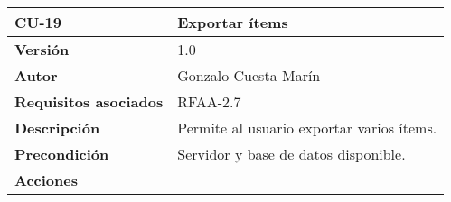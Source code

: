 \begin{longtable}[]{@{}ll@{}}
\toprule
\begin{minipage}[b]{0.23\columnwidth}\raggedright
\textbf{CU-19}\strut
\end{minipage} & \begin{minipage}[b]{0.71\columnwidth}\raggedright
\textbf{Exportar ítems}\strut
\end{minipage}\tabularnewline
\midrule
\endhead
\begin{minipage}[t]{0.23\columnwidth}\raggedright
\textbf{Versión}\strut
\end{minipage} & \begin{minipage}[t]{0.71\columnwidth}\raggedright
1.0\strut
\end{minipage}\tabularnewline
\begin{minipage}[t]{0.23\columnwidth}\raggedright
\textbf{Autor}\strut
\end{minipage} & \begin{minipage}[t]{0.71\columnwidth}\raggedright
Gonzalo Cuesta Marín\strut
\end{minipage}\tabularnewline
\begin{minipage}[t]{0.23\columnwidth}\raggedright
\textbf{Requisitos asociados}\strut
\end{minipage} & \begin{minipage}[t]{0.71\columnwidth}\raggedright
RFAA-2.7\strut
\end{minipage}\tabularnewline
\begin{minipage}[t]{0.23\columnwidth}\raggedright
\textbf{Descripción}\strut
\end{minipage} & \begin{minipage}[t]{0.71\columnwidth}\raggedright
Permite al usuario exportar varios ítems.\strut
\end{minipage}\tabularnewline
\begin{minipage}[t]{0.23\columnwidth}\raggedright
\textbf{Precondición}\strut
\end{minipage} & \begin{minipage}[t]{0.71\columnwidth}\raggedright
Servidor y base de datos disponible.\strut
\end{minipage}\tabularnewline
\begin{minipage}[t]{0.23\columnwidth}\raggedright
\textbf{Acciones}\strut
\end{minipage} & \begin{minipage}[t]{0.71\columnwidth}\raggedright
\begin{enumerate}
\def\labelenumi{\arabic{enumi}.}

\end{enumerate}
\end{minipage}
\end{longtable}

